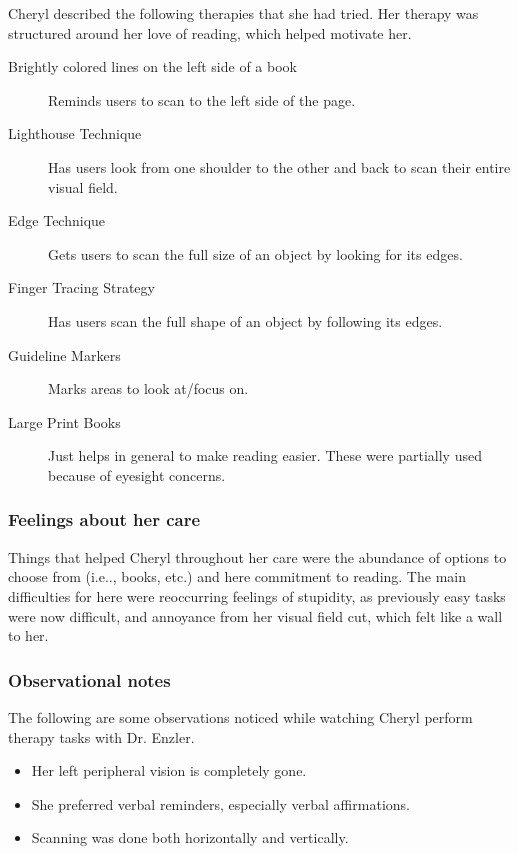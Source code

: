 Cheryl described the following therapies that she had tried. Her therapy was
structured around her love of reading, which helped motivate her.

\begin{description}
\item[Brightly colored lines on the left side of a book] Reminds users to scan
  to the left side of the page.
\item[Lighthouse Technique] Has users look from one shoulder to the other and
  back to scan their entire visual field.
\item[Edge Technique] Gets users to scan the full size of an object by looking
  for its edges.
\item[Finger Tracing Strategy] Has users scan the full shape of an object by
  following its edges.
\item[Guideline Markers] Marks areas to look at/focus on.
\item[Large Print Books] Just helps in general to make reading easier. These
  were partially used because of eyesight concerns.
\end{description}

\subsubsection{Feelings about her care}

Things that helped Cheryl throughout her care were the abundance of options to
choose from (i.e.., books, etc.) and here commitment to reading. The main
difficulties for here were reoccurring feelings of stupidity, as
previously easy tasks were now difficult, and annoyance from her visual field
cut, which felt like a wall to her.

\subsubsection{Observational notes}

The following are some observations noticed while watching Cheryl perform
therapy tasks with Dr. Enzler.
\begin{itemize}
\item Her left peripheral vision is completely gone.
\item She preferred verbal reminders, especially verbal affirmations.
\item Scanning was done both horizontally and vertically.
\end{itemize}

